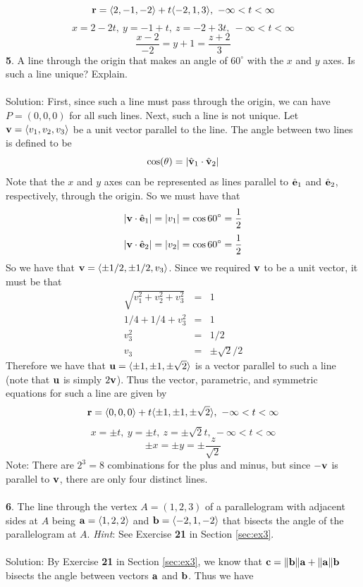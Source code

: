 \documentclass[12pt]{amsbook}
\newcommand{\la}{\langle}
\newcommand{\ra}{\rangle}
\begin{document}
 $${\bf r} = \la 2,-1,-2\ra +t\la -2,1,3\ra, \ -\infty<t<\infty$$
 $$x=2-2t, \ y=-1+t, \ z=-2+3t, \ -\infty<t<\infty$$
 $$\frac{x-2}{-2}=y+1=\frac{z+2}{3}$$
{\small\bf 5}. A line through the origin that makes an angle 
of $60^\circ$ with 
the $x$ and $y$ axes. Is such a line unique? Explain.\\
\\
{\sc Solution}: First, since such a line must pass through the origin, we can have $P=(0,0,0)$ for all such lines. Next, such a line is not unique. Let ${\bf v}=\la v_1,v_2,v_3\ra$ be a unit vector parallel to the line. The angle between two lines is defined to be
$$\cos(\theta)=|\hat{\bf v}_1\cdot\hat{\bf v}_2|$$
Note that the $x$ and $y$ axes can be represented as lines parallel to $\hat{\bf e}_1$ and $\hat{\bf e}_2$, respectively, through the origin. So we must have that
$$|{\bf v}\cdot\hat{\bf e}_1|=|v_1|=\cos 60^{\circ}=\frac{1}{2}$$
$$|{\bf v}\cdot\hat{\bf e}_2|=|v_2|=\cos 60^{\circ}=\frac{1}{2}$$
So we have that ${\bf v}=\la \pm 1/2, \pm 1/2, v_3\ra$. Since we required ${\bf v}$ to be a unit vector, it must be that
\begin{eqnarray*}
\sqrt{v_1^2+v_2^2+v_3^2}&=&1\\
1/4+1/4+v_3^2&=&1\\
v_3^2&=&1/2\\
v_3&=&\pm \sqrt{2}/2
\end{eqnarray*}
Therefore we have that ${\bf u}=\la \pm 1, \pm 1, \pm \sqrt{2} \ra$ is a vector parallel to such a line (note that $\bf u$ is simply $2{\bf v}$). Thus the vector, parametric, and symmetric equations for such a line are given by
 $${\bf r} = \la 0,0,0\ra +t\la \pm 1, \pm 1, \pm \sqrt{2} \ra, \ -\infty<t<\infty$$
 $$x=\pm t, \ y=\pm t, \ z=\pm \sqrt{2} t, \ -\infty<t<\infty$$
 $$\pm x=\pm y=\pm \frac{z}{\sqrt{2}}$$
 Note: There are $2^3=8$ combinations for the plus and minus, but since $-{\bf v}$ is parallel to ${\bf v}$, there are only four distinct lines. 
 \\
 \\
{\small\bf 6}. The line through the vertex $A=(1,2,3)$ of a parallelogram
with adjacent sides at $A$ being ${\bf a}=\la 1,2,2\ra$ and ${\bf b}=
\la -2,1,-2\ra$ that bisects the angle of the parallelogram at $A$.
{\it Hint}: See Exercise {\small\bf 21} in Section \ref{sec:ex3}.\\
\\
{\sc Solution}: By Exercise {\small\bf 21} in Section \ref{sec:ex3}, we know that ${\bf c}=\|{\bf b}\|{\bf a}+\|{\bf a}\|{\bf b}$ bisects the angle between vectors ${\bf a}$ and ${\bf b}$. Thus we have
\end{document}
